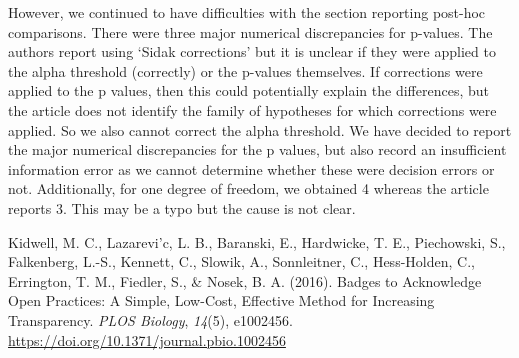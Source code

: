 \documentclass[english,,man,floatsintext]{apa6}
\begin{document}
\begin{appendix}
However, we continued to have difficulties with the section reporting
post-hoc comparisons. There were three major numerical discrepancies for
p-values. The authors report using `Sidak corrections' but it is unclear
if they were applied to the alpha threshold (correctly) or the p-values
themselves. If corrections were applied to the p values, then this could
potentially explain the differences, but the article does not identify
the family of hypotheses for which corrections were applied. So we also
cannot correct the alpha threshold. We have decided to report the major
numerical discrepancies for the p values, but also record an
insufficient information error as we cannot determine whether these were
decision errors or not. Additionally, for one degree of freedom, we
obtained 4 whereas the article reports 3. This may be a typo but the
cause is not clear.

\hypertarget{refs}{}
\leavevmode\hypertarget{ref-kidwell2016}{}%
Kidwell, M. C., Lazarevi\a'c, L. B., Baranski, E., Hardwicke, T. E.,
Piechowski, S., Falkenberg, L.-S., Kennett, C., Slowik, A., Sonnleitner,
C., Hess-Holden, C., Errington, T. M., Fiedler, S., \& Nosek, B. A.
(2016). Badges to Acknowledge Open Practices: A Simple, Low-Cost,
Effective Method for Increasing Transparency. \emph{PLOS Biology},
\emph{14}(5), e1002456.
\url{https://doi.org/10.1371/journal.pbio.1002456}
\end{appendix}
\end{document}
